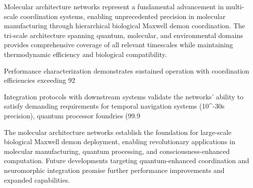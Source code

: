 Molecular architecture networks represent a fundamental advancement in multi-scale coordination systems, enabling unprecedented precision in molecular manufacturing through hierarchical biological Maxwell demon coordination. The tri-scale architecture spanning quantum, molecular, and environmental domains provides comprehensive coverage of all relevant timescales while maintaining thermodynamic efficiency and biological compatibility.

Performance characterization demonstrates sustained operation with coordination efficiencies exceeding 92%

Integration protocols with downstream systems validate the networks' ability to satisfy demanding requirements for temporal navigation systems (10^{-30}s precision), quantum processor foundries (99.9%

The molecular architecture networks establish the foundation for large-scale biological Maxwell demon deployment, enabling revolutionary applications in molecular manufacturing, quantum processing, and consciousness-enhanced computation. Future developments targeting quantum-enhanced coordination and neuromorphic integration promise further performance improvements and expanded capabilities.
